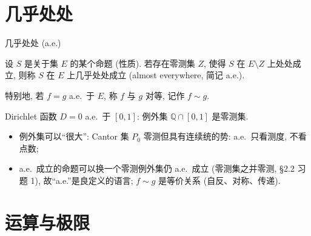 
\section{几乎处处}


\begin{frame}{几乎处处 (a.e.)}

\begin{Def}[几乎处处]
设 $S$ 是关于集 $E$ 的某个命题 (性质). 若存在\alert{零测集} $Z$, 使得 $S$ 在 $E \setminus Z$ 上处处成立, 则称 $S$ 在 $E$ 上\alert{几乎处处}成立 (almost everywhere, 简记 a.e.).

特别地, 若 $f = g$ a.e.\ 于 $E$, 称 $f$ 与 $g$ \alert{对等}, 记作 $f \sim g$.
\end{Def}

\pause

\begin{eg}
Dirichlet 函数 $D = 0$ a.e.\ 于 $[0,1]$: 例外集 $\mathbb{Q} \cap [0,1]$ 是零测集.
\end{eg}

\pause

\begin{remark}
\begin{itemize}
\item 例外集可以``很大'': Cantor 集 $P_0$ 零测但具有连续统的势: a.e.\ 只看\alert{测度}, 不看点数;
\item a.e.\ 成立的命题可以换一个零测例外集仍 a.e.\ 成立 (零测集之并零测, §2.2 习题 1), 故``a.e.''是良定义的语言; $f \sim g$ 是等价关系 (自反、对称、传递).
\end{itemize}
\end{remark}

\end{frame}


\section[极限运算]{运算与极限}


